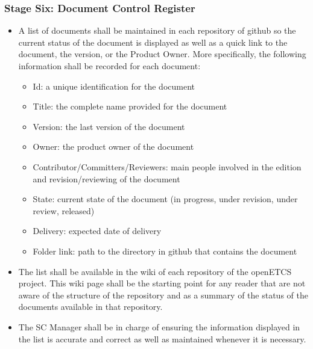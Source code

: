 \documentclass{template/openetcs_article}
\begin{document}
\subsubsection{Stage Six: Document Control Register}
\begin{itemize}
\item A list of documents shall be maintained in each repository of github so the current status of the document is displayed as well as a quick link to the document, the version, or the Product Owner. More specifically, the following information shall be recorded for each document:
\begin{itemize}
\item Id: a unique identification for the document
\item Title: the complete name provided for the document
\item Version: the last version of the document
\item Owner: the product owner of the document
\item Contributor/Committers/Reviewers: main people involved in the edition and revision/reviewing of the document
\item State: current state of the document (in progress, under revision, under review, released)
\item Delivery: expected date of delivery
\item Folder link: path to the directory in github that contains the document
\end{itemize}
\item The list shall be available in the wiki of each repository of the openETCS project. This wiki page shall be the starting point for any reader that are not aware of the structure of the repository and as a summary of the status of the documents available in that repository.
\item The SC Manager shall be in charge of ensuring the information displayed in the list is accurate and correct as well as maintained whenever it is necessary.
\end{itemize}
\end{document}
